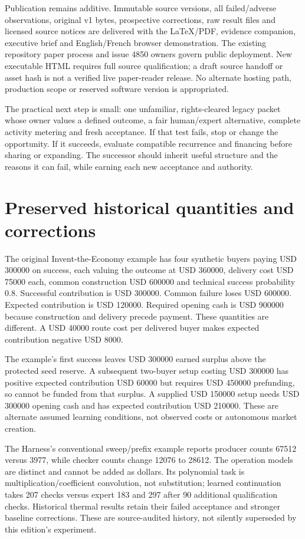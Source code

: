 Publication remains additive. Immutable source versions, all failed/adverse observations, original v1 bytes, prospective corrections, raw result files and licensed source notices are delivered with the LaTeX/PDF, evidence companion, executive brief and English/French browser demonstration. The existing repository paper process and issue 4850 owners govern public deployment. New executable HTML requires full source qualification; a draft source handoff or asset hash is not a verified live paper-reader release. No alternate hosting path, production scope or reserved software version is appropriated.\citep{paperpolicy}

The practical next step is small: one unfamiliar, rights-cleared legacy packet whose owner values a defined outcome, a fair human/expert alternative, complete activity metering and fresh acceptance. If that test fails, stop or change the opportunity. If it succeeds, evaluate compatible recurrence and financing before sharing or expanding. The successor should inherit useful structure and the reasons it can fail, while earning each new acceptance and authority.

\appendix
\section{Preserved historical quantities and corrections}

The original Invent-the-Economy example has four synthetic buyers paying USD 300000 on success, each valuing the outcome at USD 360000, delivery cost USD 75000 each, common construction USD 600000 and technical success probability 0.8. Successful contribution is USD 300000. Common failure loses USD 600000. Expected contribution is USD 120000. Required opening cash is USD 900000 because construction and delivery precede payment. These quantities are different. A USD 40000 route cost per delivered buyer makes expected contribution negative USD 8000.\citep{economy}

The example's first success leaves USD 300000 earned surplus above the protected seed reserve. A subsequent two-buyer setup costing USD 300000 has positive expected contribution USD 60000 but requires USD 450000 prefunding, so cannot be funded from that surplus. A supplied USD 150000 setup needs USD 300000 opening cash and has expected contribution USD 210000. These are alternate assumed learning conditions, not observed costs or autonomous market creation.

The Harness's conventional sweep/prefix example reports producer counts 67512 versus 3977, while checker counts change 12076 to 28612. The operation models are distinct and cannot be added as dollars. Its polynomial task is multiplication/coefficient convolution, not substitution; learned continuation takes 207 checks versus expert 183 and 297 after 90 additional qualification checks. Historical thermal results retain their failed acceptance and stronger baseline corrections. These are source-audited history, not silently superseded by this edition's experiment.\citep{harness,repository}

